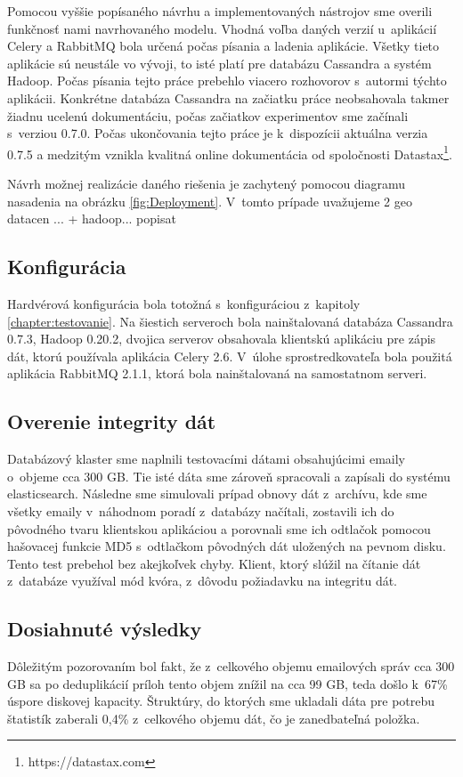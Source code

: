\documentclass[11pt,twoside,a4paper]{book}
\begin{document}
Pomocou vyššie popísaného návrhu a implementovaných nástrojov sme overili funkčnosť nami navrhovaného modelu. Vhodná voľba daných verzií u~aplikácií Celery a RabbitMQ bola určená počas písania a ladenia aplikácie. Všetky tieto aplikácie sú neustále vo vývoji, to isté platí pre databázu Cassandra a systém Hadoop. Počas písania tejto práce prebehlo viacero rozhovorov s~autormi týchto aplikácii. Konkrétne databáza Cassandra na začiatku práce neobsahovala takmer žiadnu ucelenú dokumentáciu, počas začiatkov experimentov sme začínali s~verziou 0.7.0. Počas ukončovania tejto práce je k~dispozícii aktuálna verzia 0.7.5 a medzitým vznikla kvalitná online dokumentácia od spoločnosti Datastax\footnote{https://datastax.com}. 


Návrh možnej realizácie daného riešenia je zachytený pomocou diagramu nasadenia na obrázku \ref{fig:Deployment}. V~tomto prípade uvažujeme 2 geo datacen ... + hadoop... popisat

\subsection*{Konfigurácia}
Hardvérová konfigurácia bola totožná s~konfiguráciou z~kapitoly \ref{chapter:testovanie}. Na šiestich serveroch bola nainštalovaná databáza Cassandra 0.7.3, Hadoop 0.20.2, dvojica serverov obsahovala klientskú aplikáciu pre zápis dát, ktorú používala aplikácia Celery 2.6. V~úlohe sprostredkovateľa bola použitá aplikácia RabbitMQ 2.1.1, ktorá bola nainštalovaná na samostatnom serveri.


\subsection*{Overenie integrity dát}
Databázový klaster sme naplnili testovacími dátami obsahujúcimi emaily o~objeme cca 300 GB. Tie isté dáta sme zároveň spracovali a zapísali do systému elasticsearch. Následne sme simulovali prípad obnovy dát z~archívu, kde sme všetky emaily v~náhodnom poradí z~databázy načítali, zostavili ich do pôvodného tvaru klientskou aplikáciou a porovnali sme ich odtlačok pomocou hašovacej funkcie MD5 s~odtlačkom pôvodných dát uložených na pevnom disku. Tento test prebehol bez akejkoľvek chyby. 
Klient, ktorý slúžil na čítanie dát z~databáze využíval mód kvóra, z~dôvodu požiadavku na integritu dát.


\subsection*{Dosiahnuté výsledky}
Dôležitým pozorovaním bol fakt, že z~celkového objemu emailových správ cca 300 GB sa po deduplikácií príloh tento objem znížil na cca 99 GB, teda došlo k~67\% úspore diskovej kapacity. Štruktúry, do ktorých sme ukladali dáta pre potrebu štatistík zaberali 0,4\% z~celkového objemu dát, čo je zanedbateľná položka.
\end{document}
